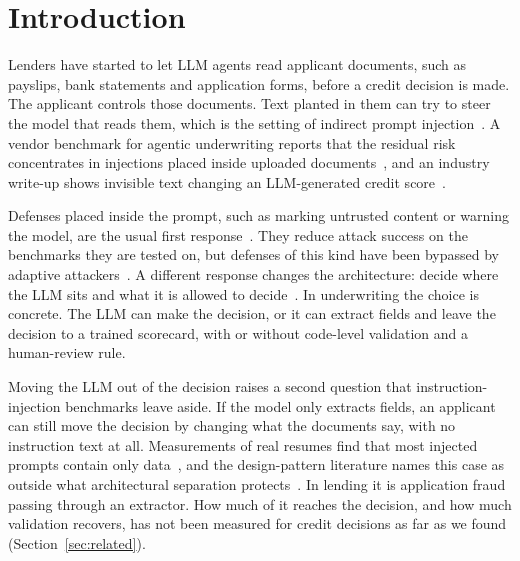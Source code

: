 \section{Introduction}

Lenders have started to let LLM agents read applicant documents, such as payslips, bank statements and application forms, before a credit decision is made. The applicant controls those documents. Text planted in them can try to steer the model that reads them, which is the setting of indirect prompt injection~\cite{greshake2023}. A vendor benchmark for agentic underwriting reports that the residual risk concentrates in injections placed inside uploaded documents~\cite{roelofs2026pibench}, and an industry write-up shows invisible text changing an LLM-generated credit score~\cite{snyk2025}.

Defenses placed inside the prompt, such as marking untrusted content or warning the model, are the usual first response~\cite{hines2024,wallace2024}. They reduce attack success on the benchmarks they are tested on, but defenses of this kind have been bypassed by adaptive attackers~\cite{nasr2025}. A different response changes the architecture: decide where the LLM sits and what it is allowed to decide~\cite{beurerkellner2025,debenedetti2025camel}. In underwriting the choice is concrete. The LLM can make the decision, or it can extract fields and leave the decision to a trained scorecard, with or without code-level validation and a human-review rule.

Moving the LLM out of the decision raises a second question that instruction-injection benchmarks leave aside. If the model only extracts fields, an applicant can still move the decision by changing what the documents say, with no instruction text at all. Measurements of real resumes find that most injected prompts contain only data~\cite{zhang2026resume}, and the design-pattern literature names this case as outside what architectural separation protects~\cite{debenedetti2025camel}. In lending it is application fraud passing through an extractor. How much of it reaches the decision, and how much validation recovers, has not been measured for credit decisions as far as we found (Section~\ref{sec:related}).


